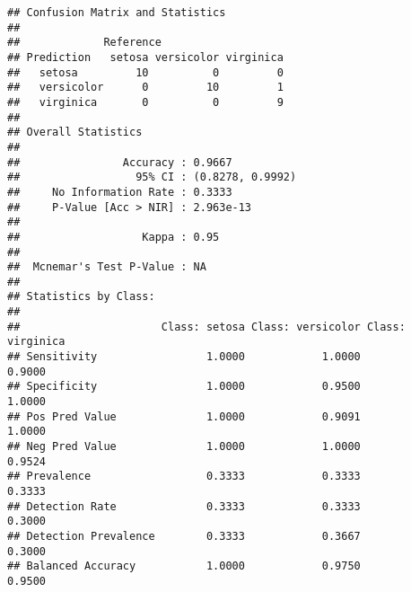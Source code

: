 \documentclass[]{article}
\begin{document}
\begin{verbatim}
## Confusion Matrix and Statistics
## 
##             Reference
## Prediction   setosa versicolor virginica
##   setosa         10          0         0
##   versicolor      0         10         1
##   virginica       0          0         9
## 
## Overall Statistics
##                                           
##                Accuracy : 0.9667          
##                  95% CI : (0.8278, 0.9992)
##     No Information Rate : 0.3333          
##     P-Value [Acc > NIR] : 2.963e-13       
##                                           
##                   Kappa : 0.95            
##                                           
##  Mcnemar's Test P-Value : NA              
## 
## Statistics by Class:
## 
##                      Class: setosa Class: versicolor Class: virginica
## Sensitivity                 1.0000            1.0000           0.9000
## Specificity                 1.0000            0.9500           1.0000
## Pos Pred Value              1.0000            0.9091           1.0000
## Neg Pred Value              1.0000            1.0000           0.9524
## Prevalence                  0.3333            0.3333           0.3333
## Detection Rate              0.3333            0.3333           0.3000
## Detection Prevalence        0.3333            0.3667           0.3000
## Balanced Accuracy           1.0000            0.9750           0.9500
\end{verbatim}
\end{document}
